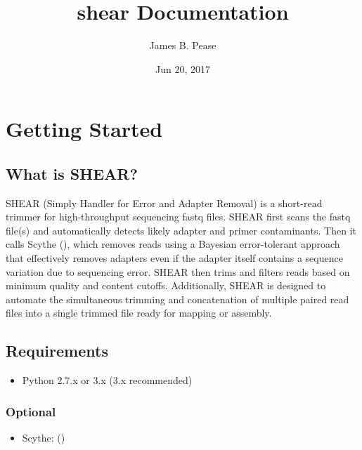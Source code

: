 \documentclass[letterpaper,10pt,english]{sphinxmanual}
\title{shear Documentation}
\date{Jun 20, 2017}
\author{James B. Pease}
\begin{document}
\maketitle
\sphinxtableofcontents
{}\label{\detokenize{index::doc}}



\chapter{Getting Started}
\label{\detokenize{intro:getting-started}}\label{\detokenize{intro:welcome-to-shear-s-documentation}}\label{\detokenize{intro::doc}}\label{\detokenize{intro:intro}}

\section{What is SHEAR?}
\label{\detokenize{intro:what-is-shear}}
SHEAR (Simply Handler for Error and Adapter Removal) is a short-read trimmer for high-throughput sequencing fastq files.
SHEAR first scans the fastq file(s) and automatically detects likely adapter and primer contaminants.  Then it calls
Scythe (), which removes reads using a Bayesian error-tolerant approach that
effectively removes adapters even if the adapter itself contains a sequence variation due to sequencing error.
SHEAR then trims and filters reads based on minimum quality and content cutoffs.  Additionally, SHEAR is designed to
automate the simultaneous trimming and concatenation of multiple paired read files into a single trimmed file ready
for mapping or assembly.


\section{Requirements}
\label{\detokenize{intro:requirements}}\begin{itemize}
\item {} 
Python 2.7.x or 3.x (3.x recommended)

\end{itemize}


\subsection{Optional}
\label{\detokenize{intro:optional}}\begin{itemize}
\item {} 
Scythe:  ()

\end{itemize}
\end{document}
